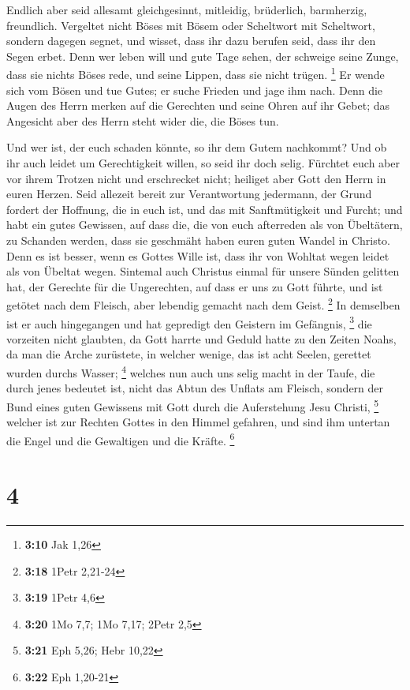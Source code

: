  Endlich aber seid allesamt gleichgesinnt, mitleidig,
brüderlich, barmherzig, freundlich.  Vergeltet nicht Böses
mit Bösem oder Scheltwort mit Scheltwort, sondern dagegen segnet, und
wisset, dass ihr dazu berufen seid, dass ihr den Segen erbet.
 Denn wer leben will und gute Tage sehen, der schweige
seine Zunge, dass sie nichts Böses rede, und seine Lippen, dass sie
nicht trügen. \footnote{\textbf{3:10} Jak 1,26}  Er wende
sich vom Bösen und tue Gutes; er suche Frieden und jage ihm nach.
 Denn die Augen des Herrn merken auf die Gerechten und
seine Ohren auf ihr Gebet; das Angesicht aber des Herrn steht wider die,
die Böses tun.

 Und wer ist, der euch schaden könnte, so ihr dem Gutem
nachkommt?  Und ob ihr auch leidet um Gerechtigkeit willen,
so seid ihr doch selig. Fürchtet euch aber vor ihrem Trotzen nicht und
erschrecket nicht;  heiliget aber Gott den Herrn in euren
Herzen. Seid allezeit bereit zur Verantwortung jedermann, der Grund
fordert der Hoffnung, die in euch ist,  und das mit
Sanftmütigkeit und Furcht; und habt ein gutes Gewissen, auf dass die,
die von euch afterreden als von Übeltätern, zu Schanden werden, dass sie
geschmäht haben euren guten Wandel in Christo.  Denn es ist
besser, wenn es Gottes Wille ist, dass ihr von Wohltat wegen leidet als
von Übeltat wegen.  Sintemal auch Christus einmal für
unsere Sünden gelitten hat, der Gerechte für die Ungerechten, auf dass
er uns zu Gott führte, und ist getötet nach dem Fleisch, aber lebendig
gemacht nach dem Geist. \footnote{\textbf{3:18} 1Petr 2,21-24}
 In demselben ist er auch hingegangen und hat gepredigt den
Geistern im Gefängnis, \footnote{\textbf{3:19} 1Petr 4,6} 
die vorzeiten nicht glaubten, da Gott harrte und Geduld hatte zu den
Zeiten Noahs, da man die Arche zurüstete, in welcher wenige, das ist
acht Seelen, gerettet wurden durchs Wasser; \footnote{\textbf{3:20} 1Mo
  7,7; 1Mo 7,17; 2Petr 2,5}  welches nun auch uns selig
macht in der Taufe, die durch jenes bedeutet ist, nicht das Abtun des
Unflats am Fleisch, sondern der Bund eines guten Gewissens mit Gott
durch die Auferstehung Jesu Christi, \footnote{\textbf{3:21} Eph 5,26;
  Hebr 10,22}  welcher ist zur Rechten Gottes in den Himmel
gefahren, und sind ihm untertan die Engel und die Gewaltigen und die
Kräfte. \footnote{\textbf{3:22} Eph 1,20-21}

\hypertarget{section-2}{%
\section{4}\label{section-2}}

